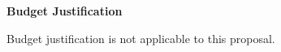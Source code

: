 \documentclass[11pt]{article}
\begin{document}
\begin{center}
  {\Large\bfseries Budget Justification}
\end{center}

Budget justification is not applicable to this proposal.





\end{document}
